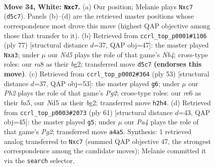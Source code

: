 \documentclass[11pt]{article}
\begin{document}
\clearpage

\begin{figure}[p]\centering
\begin{subfigure}{0.46\textwidth}\centering
\resizebox{\linewidth}{!}{%
\newchessgame
\chessboard[
  setfen={r4b2/ppp4k/4rpp1/3N3p/P7/6P1/RPP2P1P/6K1 w - - 1 34},
  showmover=false,
  pgfstyle=straightmove, color=movearrow, markmove={d5-c7}
]}
\caption{}
\end{subfigure}\hfill
\begin{subfigure}{0.46\textwidth}\centering
\resizebox{\linewidth}{!}{%
\newchessgame
\chessboard[
  setfen={8/5pkp/r5p1/pn6/2R2P2/P1P3PP/6B1/6K1 b - - 0 39},
  showmover=false,
  pgfstyle=straightmove, color=movearrow, markmove={b5-a3}
]}
\caption{}
\end{subfigure}
\\[4pt]
\begin{subfigure}{0.46\textwidth}\centering
\resizebox{\linewidth}{!}{%
\newchessgame
\chessboard[
  setfen={6k1/3r1pp1/8/Bn1p3p/b1p4P/P1P3P1/5PBK/2R5 b - - 1 27},
  showmover=false,
  pgfstyle=straightmove, color=movearrow, markmove={g7-g6}
]}
\caption{}
\end{subfigure}\hfill
\begin{subfigure}{0.46\textwidth}\centering
\resizebox{\linewidth}{!}{%
\newchessgame
\chessboard[
  setfen={2k3r1/p1p3pp/Ppp1P3/8/1P2R3/4PK2/1Bn5/8 b - - 2 31},
  showmover=false,
  pgfstyle=straightmove, color=movearrow, markmove={g7-g5}
]}
\caption{}
\end{subfigure}
\caption{\textbf{Move 34, White: \texttt{Nxc7}.} (a) Our position; Melanie plays \texttt{Nxc7} (\texttt{d5c7}). Panels (b)--(d) are the retrieved master positions whose correspondence most drove this move (highest QAP objective among those that transfer to it). (b) Retrieved from \texttt{ccrl\_top\_p0001\#1106} (ply 77) [structural distance $d$=37, QAP obj=47]: the master played \texttt{Nxa3}; under $\mu$ our \emph{Nd5} plays the role of that game's \emph{Nb4}; cross-type roles: our \emph{r}a8 as their \emph{b}g2; transferred move \texttt{d5c7} \textbf{(endorses this move)}. (c) Retrieved from \texttt{ccrl\_top\_p0002\#364} (ply 53) [structural distance $d$=37, QAP obj=53]: the master played \texttt{g6}; under $\mu$ our \emph{Ph2} plays the role of that game's \emph{Pg2}; cross-type roles: our \emph{r}e6 as their \emph{b}a5, our \emph{N}d5 as their \emph{b}g2; transferred move \texttt{h2h4}. (d) Retrieved from \texttt{ccrl\_top\_p0003\#2073} (ply 61) [structural distance $d$=43, QAP obj=45]: the master played \texttt{g5}; under $\mu$ our \emph{Pa4} plays the role of that game's \emph{Pg2}; transferred move \texttt{a4a5}. Synthesis: 1 retrieved analog transferred to \texttt{Nxc7} (summed QAP objective 47, the strongest correspondence among the candidate moves); Melanie committed it via the \texttt{search} selector.}
\label{fig:thought-m66}
\end{figure}
\end{document}
